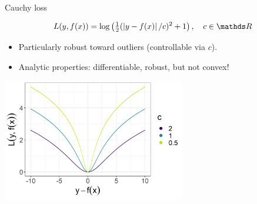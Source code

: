 \begin{vbframe}{Cauchy loss}

$$
\Lxy = \log \left(\tfrac{1}{2} (\left|y - \fx\right| / c)^2 + 1\right), \quad c \in \R
$$

\normalsize
\begin{itemize}
\item Particularly robust toward outliers (controllable via $c$).
\item Analytic properties: differentiable, robust, but not convex! 
\end{itemize}

\vfill

\begin{center}
\includegraphics[width = 0.6\textwidth]{figure/loss_cauchy.png}
\end{center}

\end{vbframe}


\endlecture

